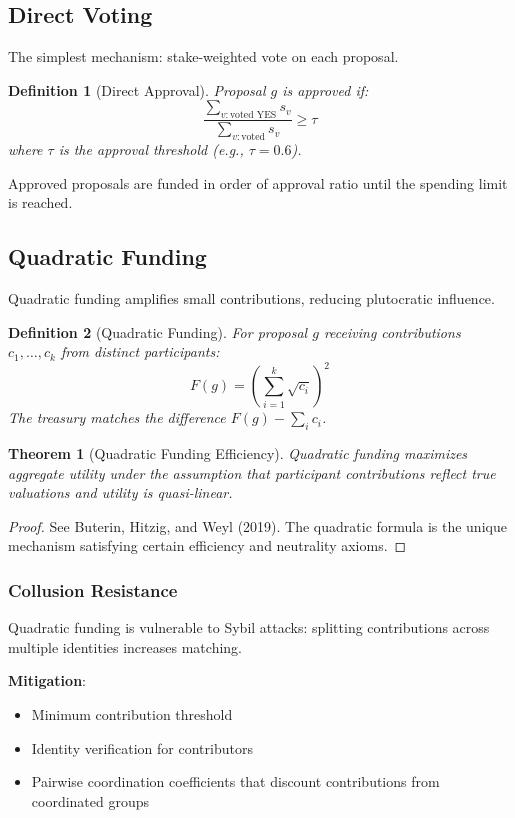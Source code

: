 \documentclass[11pt,a4paper]{article}
\newtheorem{definition}{Definition}
\newtheorem{theorem}{Theorem}
\begin{document}
\subsection{Direct Voting}

The simplest mechanism: stake-weighted vote on each proposal.

\begin{definition}[Direct Approval]
Proposal $g$ is approved if:
\[
\frac{\sum_{v: \text{voted YES}} s_v}{\sum_{v: \text{voted}} s_v} \geq \tau
\]
where $\tau$ is the approval threshold (e.g., $\tau = 0.6$).
\end{definition}

Approved proposals are funded in order of approval ratio until the spending limit is reached.

\subsection{Quadratic Funding}

Quadratic funding amplifies small contributions, reducing plutocratic influence.

\begin{definition}[Quadratic Funding]
For proposal $g$ receiving contributions $c_1, \ldots, c_k$ from distinct participants:
\[
F(g) = \left( \sum_{i=1}^{k} \sqrt{c_i} \right)^2
\]
The treasury matches the difference $F(g) - \sum_i c_i$.
\end{definition}

\begin{theorem}[Quadratic Funding Efficiency]
Quadratic funding maximizes aggregate utility under the assumption that participant contributions reflect true valuations and utility is quasi-linear.
\end{theorem}

\begin{proof}
See Buterin, Hitzig, and Weyl (2019). The quadratic formula is the unique mechanism satisfying certain efficiency and neutrality axioms.
\end{proof}

\subsubsection{Collusion Resistance}

Quadratic funding is vulnerable to Sybil attacks: splitting contributions across multiple identities increases matching.

\textbf{Mitigation}:
\begin{itemize}
    \item Minimum contribution threshold
    \item Identity verification for contributors
    \item Pairwise coordination coefficients that discount contributions from coordinated groups
\end{itemize}
\end{document}
